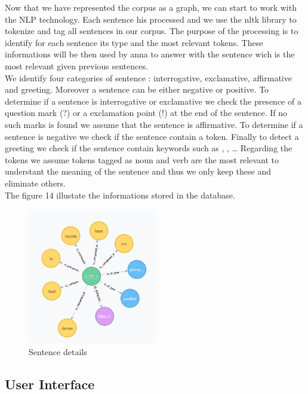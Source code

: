 Now that we have represented the corpus as a graph, we can start to work with the NLP technology. Each sentence his processed and we use the nltk library to tokenize and tag all sentences in our corpus. The purpose of the processing is to identify for each sentence its type and the most relevant tokens. These informations will be then used by anna to answer with the sentence wich is the most relevant given previous sentences.\\
We identify four categories of sentence : interrogative, exclamative, affirmative and greeting. Moreover a sentence can be either negative or positive. To determine if a sentence is interrogative or exclamative we check the presence of a question mark (?) or a exclamation point (!) at the end of the sentence. If no such marks is found we assume that the sentence is affirmative. To determine if a sentence is negative we check if the sentence contain a  token. Finally to detect a greeting we check if the sentence contain keywords such as , ,  \dots
Regarding the tokens we assume tokens tagged as noun and verb are the most relevant to understant the meaning of the sentence and thus we only keep these and eliminate others.\\
The figure 14 illustate the informations stored in the database.

\begin{figure}[!h]
\begin{center}
\includegraphics[width=0.5\textwidth]{./img/graph1711.png}
\end{center}
\caption{Sentence details}
\label{fig:sent}
\end{figure}

%
\subsection{User Interface}
